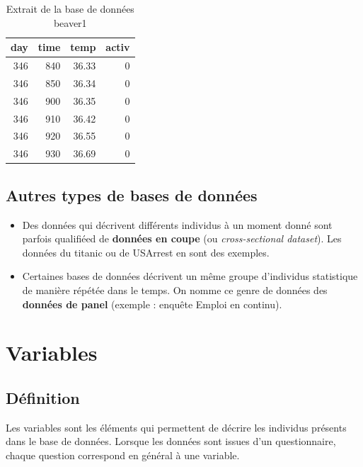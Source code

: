 \documentclass[
]{book}
\providecommand{\tightlist}{%
  \setlength{\itemsep}{0pt}\setlength{\parskip}{0pt}}
\begin{document}
\begin{table}

\caption{\label{tab:unnamed-chunk-3}Extrait de la base de données beaver1}
\centering
\begin{tabular}[t]{r|r|r|r}
\hline
day & time & temp & activ\\
\hline
346 & 840 & 36.33 & 0\\
\hline
346 & 850 & 36.34 & 0\\
\hline
346 & 900 & 36.35 & 0\\
\hline
346 & 910 & 36.42 & 0\\
\hline
346 & 920 & 36.55 & 0\\
\hline
346 & 930 & 36.69 & 0\\
\hline
\end{tabular}
\end{table}

\hypertarget{autres-types-de-bases-de-donnuxe9es}{%
\subsection{Autres types de bases de données}\label{autres-types-de-bases-de-donnuxe9es}}

\begin{itemize}
\tightlist
\item
  Des données qui décrivent différents individus à un moment donné sont parfois qualifiéed de \textbf{données en coupe} (ou \emph{cross-sectional dataset}). Les données du titanic ou de USArrest en sont des exemples.
\item
  Certaines bases de données décrivent un même groupe d'individus statistique de manière répétée dans le temps. On nomme ce genre de données des \textbf{données de panel} (exemple : enquête Emploi en continu).
\end{itemize}

\hypertarget{variables}{%
\section{Variables}\label{variables}}

\hypertarget{duxe9finition}{%
\subsection{Définition}\label{duxe9finition}}

Les variables sont les éléments qui permettent de décrire les individus présents dans le base de données. Lorsque les données sont issues d'un questionnaire, chaque question correspond en général à une variable.
\end{document}
